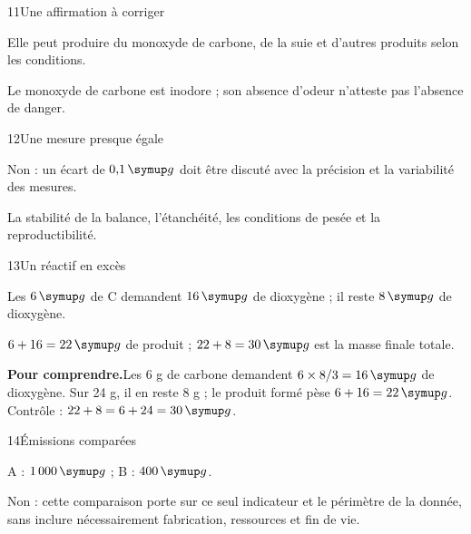 \par\noindent\begin{minipage}{\linewidth}
\begin{corrige}{11}{Une affirmation à corriger}
\begin{questions}
\item Elle peut produire du monoxyde de carbone, de la suie et d’autres produits selon les conditions.
\item Le monoxyde de carbone est inodore ; son absence d’odeur n’atteste pas l’absence de danger.
\end{questions}
\end{corrige}
\end{minipage}
\par\noindent\begin{minipage}{\linewidth}
\begin{corrige}{12}{Une mesure presque égale}
\begin{questions}
\item Non : un écart de $0{,}1\unite g$ doit être discuté avec la précision et la variabilité des mesures.
\item La stabilité de la balance, l’étanchéité, les conditions de pesée et la reproductibilité.
\end{questions}
\end{corrige}
\end{minipage}
\par\noindent\begin{minipage}{\linewidth}
\begin{corrige}{13}{Un réactif en excès}
\begin{questions}
\item Les $6\unite g$ de C demandent $16\unite g$ de dioxygène ; il reste $8\unite g$ de dioxygène.
\item $6+16=22\unite g$ de produit ; $22+8=30\unite g$ est la masse finale totale.
\end{questions}
\par\smallskip\noindent\textbf{Pour comprendre.}\enspace Les 6 g de carbone demandent $6\times8/3=16\unite g$ de dioxygène. Sur 24 g, il en reste 8 g ; le produit formé pèse $6+16=22\unite g$. Contrôle : $22+8=6+24=30\unite g$.\par
{}
\end{corrige}
\end{minipage}
\par\noindent\begin{minipage}{\linewidth}
\begin{corrige}{14}{Émissions comparées}
\begin{questions}
\item A : $1\,000\unite g$ ; B : $400\unite g$.
\item Non : cette comparaison porte sur ce seul indicateur et le périmètre de la donnée, sans inclure nécessairement fabrication, ressources et fin de vie.
\end{questions}
\end{corrige}
\end{minipage}

